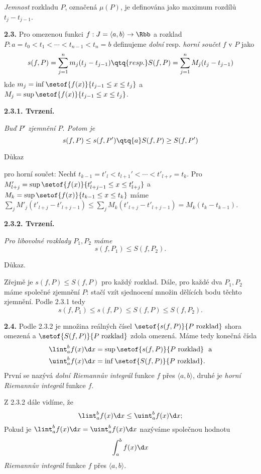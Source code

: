 \documentclass[12pt]{article}
\begin{document}
{{\em Jemnost}  rozkladu $P$, označená $\mu(P)$, je definována jako maximum rozdílů $t_{j}-t_{j-1}$.
  
  \bigskip
  
  {\bf 2.3.} Pro omezenou funkci $f:J=\langle a,b\rangle\to \Rbb$ a rozklad $P:
   a=t_0< t_1<\cdots<t_{n-1}< t_n=b$  definujeme
  {\em dolní} resp. {\em horní součet}  $f$ v $P$ jako
  $$
  s(f,P)=\sum_{j=1}^nm_j(t_j-t_{j-1}) \qtq{resp.} S(f,P)=\sum_{j=1}^nM_j(t_j-t_{j-1})
  $$
  kde $m_j=\inf\setof{f(x)}{t_{j-1}\leq x\leq t_j}$ a  $M_j=\sup\setof{f(x)}{t_{j-1}\leq x\leq t_j}$.
  
  \medskip
  
  {\bf 2.3.1. Tvrzení.} {\em Buď $P'$ zjemnění $P$. Potom je
  $$
  s(f,P)\leq s(f,P') \qtq{a} S(f,P)\geq S(f,P')
  $$
 
  
  Důkaz} pro horní součet: Nechť $t_{k-1}=t'_l< t_{l+1}'<\cdots< t'_{l+r}=t_k$. Pro $M'_{l+j}=
  \sup\setof{f(x)}{t_{l+j-1}'\leq x\leq t'_{l+j}}$ a $M_k=\sup\setof{f(x)}{t_{k-1}\leq x\leq t_k}$ máme
  $\sum_jM'_j(t'_{l+j}- t'_{l+j-1})\leq \sum_jM_k(t'_{l+j}- t'_{l+j-1})=M_k(t_k-t_{k-1})$. \sq
  
  
  \medskip
  
  {\bf 2.3.2. Tvrzení.} {\em Pro libovolné rozklady $P_1,P_2$ máme
  $$
  s(f,P_1)\leq S(f,P_2).
  $$
    
  Důkaz.} Zřejmě je $s(f,P)\leq S(f,P)$ pro každý rozklad.
  Dále, pro každé dva $P_1, P_2$ máme společné zjemnění $P$: stačí vzít sjednocení mno\v zin dělících bodu těchto zjemnění. Podle 2.3.1 tedy
  $$
  s(f,P_1)\leq s(f,P)\leq S(f,P)\leq S(f,P_2).
  $$
  \sq
  
  \bigskip 
  
  {\bf 2.4.} Podle 2.3.2 je množina reálných čísel $\setof{s(f,P)}{P\ \text{rozklad}}$ shora omezená a
  $\setof{S(f,P)}{P\ \text{rozklad}}$  zdola omezená. Máme tedy konečná čísla
  $$
  \begin{aligned}
  &\lint_a^bf(x)\d x=\sup\setof{s(f,P)}{P\ \text{rozklad}} \ \ \text{a}\\
  &\uint_a^bf(x)\d x=\inf\setof{S(f,P)}{P\ \text{rozklad}}.
  \end{aligned}
  $$
  První se nazývá {\em dolní Riemannův integrál} funkce $f$ přes $\langle a,b\rangle$, druhé je {\em horní Riemannův integrál} funkce $f$.
  
  Z 2.3.2 dále vidíme, že
  $$
  \lint_a^bf(x)\d x\leq \uint_a^bf(x)\d x;
  $$
  Pokud je $\lint_a^bf(x)\d x = \uint_a^bf(x)\d x$ nazýváme společnou hodnotu
  $$
  \int_a^bf(x)\d x
  $$
   {\em Riemannův integrál} funkce $f$ přes $\langle a,b\rangle$.
  
}
\end{document}
